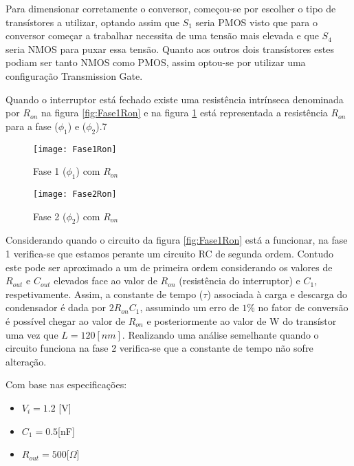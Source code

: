 \documentclass[12pt]{article}
\begin{document}
Para dimensionar corretamente o conversor, começou-se por escolher o tipo de transístores a utilizar, optando assim que $S_1$ seria PMOS visto que para o conversor começar a trabalhar necessita de uma tensão mais elevada e que $S_4$ seria NMOS para puxar essa tensão. Quanto aos outros dois transístores estes podiam ser tanto NMOS como PMOS, assim optou-se por utilizar uma configuração Transmission Gate.

Quando o interruptor está fechado existe uma resistência intrínseca  denominada por $R_{on}$ na figura \ref{fig:Fase1Ron} e na figura  \ref{fig:Fase2Ron} está representada a resistência $R_{on}$ para a fase ($\phi_1$) e ($\phi_2$).7  
\begin{figure}[htbp]
\centering
\begin{minipage}{.5\textwidth}
	\centering
	\texttt{[image: Fase1Ron]}
	\caption{Fase 1 ($\phi_1$) com $R_{on}$}
	\label{fig:Fase1Ron}
\end{minipage}%
\begin{minipage}{.5\textwidth}
	\centering
	\texttt{[image: Fase2Ron]}
	\caption{Fase 2 ($\phi_2$) com $R_{on}$}
	\label{fig:Fase2Ron}
\end{minipage}
\end{figure}

Considerando quando o circuito da figura \ref{fig:Fase1Ron} está a funcionar, na fase 1 verifica-se que estamos perante um circuito RC de segunda ordem. Contudo este pode ser aproximado a um de primeira ordem considerando os valores de $R_{out}$ e $C_{out}$ elevados face ao valor de $R_{on}$ (resistência do interruptor) e $C_{1}$, respetivamente. Assim, a constante de tempo ($\tau$) associada à carga e descarga do condensador é dada por $2R_{on}C_1$, assumindo um erro de $1\%$ no fator de conversão é possível chegar ao valor de $R_{on}$ e posteriormente ao valor de W do transístor uma vez que $L = 120 [nm]$.
Realizando uma análise semelhante quando o circuito funciona na fase 2 verifica-se que a constante de tempo não sofre alteração. 

Com base nas especificações:

\begin{itemize}
\item \begin{center} $V_i = 1.2$ [V] \end{center}
\item \begin{center} $C_1 = 0.5 $[nF] \end{center}
\item \begin{center} $R_{out} = 500 $[$\Omega$] \end{center}
\end{itemize}
\end{document}
